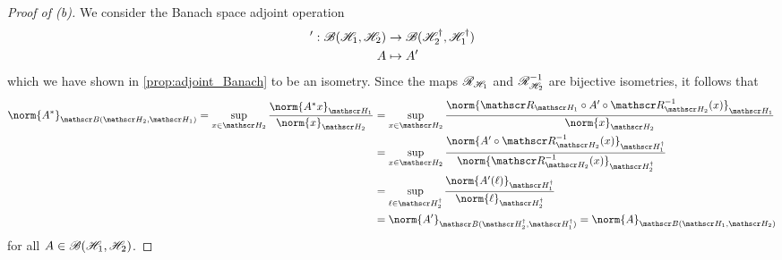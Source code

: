 \begin{proof}[Proof of (b)]
    We consider the Banach space adjoint operation
    \begin{align*}
        ' : \mathscr{B}(\mathscr{H}_1, \mathscr{H}_2) &\to \mathscr{B}(\mathscr{H}_2^\dag, \mathscr{H}_1^\dag)\\
                                           A &\mapsto A'
    \end{align*}
    which we have shown in \cref{prop:adjoint_Banach} to be an isometry. Since the maps \(\mathscr{R}_{\mathscr{H}_1}\) and \(\mathscr{R}_{\mathscr{H}_2}^{-1}\) are bijective isometries, it follows that
    \begin{align*}
        \norm{A^*}_{\bounded(\hilbert_2, \hilbert_1)} = \sup_{x \in \hilbert_2}{\frac{\norm{A^*x}_{\hilbert_1}}{\norm{x}_{\hilbert_2}}}
        &= \sup_{x \in \hilbert_2}{\frac{\norm{\riesz_{\hilbert_1}\circ A' \circ \riesz^{-1}_{\hilbert_2}(x)}_{\hilbert_1}}{\norm{x}_{\hilbert_2}}}\\
        &= \sup_{x \in \hilbert_2}{\frac{\norm{A' \circ \riesz^{-1}_{\hilbert_2}(x)}_{\hilbert_1^\dag}}{\norm{\riesz_{\hilbert_2}^{-1}(x)}_{\hilbert_2^\dag}}}\\
        &= \sup_{\ell \in \hilbert_2^\dag}{\frac{\norm{A'(\ell)}_{\hilbert_1^\dag}}{\norm{\ell}_{\hilbert_2^\dag}}}\\
        &= \norm{A'}_{\bounded(\hilbert_2^\dag, \hilbert_1^\dag)} = \norm{A}_{\bounded(\hilbert_1,\hilbert_2)}
    \end{align*}
    for all \(A \in \mathscr{B}(\mathscr{H}_1, \mathscr{H}_2)\).
\end{proof}
